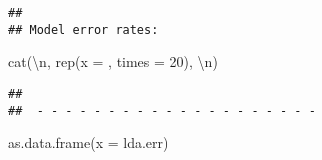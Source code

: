 \documentclass[
]{article}
\newenvironment{Shaded}{\begin{snugshade}}{\end{snugshade}}
\newcommand{\AttributeTok}[1]{\textcolor[rgb]{0.77,0.63,0.00}{#1}}
\newcommand{\DecValTok}[1]{\textcolor[rgb]{0.00,0.00,0.81}{#1}}
\newcommand{\FunctionTok}[1]{\textcolor[rgb]{0.00,0.00,0.00}{#1}}
\newcommand{\NormalTok}[1]{#1}
\newcommand{\SpecialCharTok}[1]{\textcolor[rgb]{0.00,0.00,0.00}{#1}}
\newcommand{\StringTok}[1]{\textcolor[rgb]{0.31,0.60,0.02}{#1}}
\begin{document}
\begin{verbatim}
## 
## Model error rates:
\end{verbatim}

\begin{Shaded}
\begin{Highlighting}[]
\FunctionTok{cat}\NormalTok{(}\StringTok{\textquotesingle{}}\SpecialCharTok{\textbackslash{}n}\StringTok{\textquotesingle{}}\NormalTok{, }\FunctionTok{rep}\NormalTok{(}\AttributeTok{x =} \StringTok{\textquotesingle{}{-}\textquotesingle{}}\NormalTok{, }\AttributeTok{times =} \DecValTok{20}\NormalTok{), }\StringTok{\textquotesingle{}}\SpecialCharTok{\textbackslash{}n}\StringTok{\textquotesingle{}}\NormalTok{)}
\end{Highlighting}
\end{Shaded}

\begin{verbatim}
## 
##  - - - - - - - - - - - - - - - - - - - -
\end{verbatim}

\begin{Shaded}
\begin{Highlighting}[]
\FunctionTok{as.data.frame}\NormalTok{(}\AttributeTok{x =}\NormalTok{ lda.err)}
\end{Highlighting}
\end{Shaded}
\end{document}
